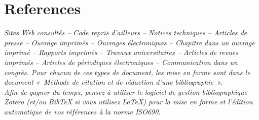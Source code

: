 \chapter*{References}

\noindent\textit{Sites Web consultés – Code repris d’ailleurs – Notices techniques – Articles de presse – Ouvrage imprimés – Ouvrages électroniques – Chapitre dans un ouvrage imprimé – Rapports imprimés – Travaux universitaires – Articles de revues imprimés – Articles de périodiques électroniques – Communication dans un congrès. Pour chacun de ces types de document, les mise en forme sont dans le document « Méthode de citation et de rédaction d’une bibliographie ».}\\

\textit{Afin de gagner du temps, pensez à utiliser le logiciel de gestion bibliographique Zotero (et/ou BibTeX si vous utilisez LaTeX) pour la mise en forme et l’édition automatique de vos références à la norme ISO690.}